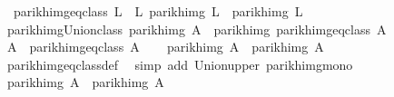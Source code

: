 \begin{isabellebody}
\ \ {\isachardoublequoteopen}parikh{\isacharunderscore}{\kern0pt}img{\isacharunderscore}{\kern0pt}eq{\isacharunderscore}{\kern0pt}class\ L\ {\isasymequiv}\ {\isacharbraceleft}{\kern0pt}L{\isacharprime}{\kern0pt}{\isachardot}{\kern0pt}\ parikh{\isacharunderscore}{\kern0pt}img\ L{\isacharprime}{\kern0pt}\ {\isacharequal}{\kern0pt}\ parikh{\isacharunderscore}{\kern0pt}img\ L{\isacharbraceright}{\kern0pt}{\isachardoublequoteclose}\isanewline
\isanewline
\isanewline
{}\isamarkupfalse%
\ parikh{\isacharunderscore}{\kern0pt}img{\isacharunderscore}{\kern0pt}Union{\isacharunderscore}{\kern0pt}class{\isacharcolon}{\kern0pt}\ {\isachardoublequoteopen}parikh{\isacharunderscore}{\kern0pt}img\ A\ {\isacharequal}{\kern0pt}\ parikh{\isacharunderscore}{\kern0pt}img\ {\isacharparenleft}{\kern0pt}{\isasymUnion}{\isacharparenleft}{\kern0pt}parikh{\isacharunderscore}{\kern0pt}img{\isacharunderscore}{\kern0pt}eq{\isacharunderscore}{\kern0pt}class\ A{\isacharparenright}{\kern0pt}{\isacharparenright}{\kern0pt}{\isachardoublequoteclose}\isanewline
%
\isadelimproof
%
\endisadelimproof
%
\isatagproof
{}\isamarkupfalse%
\isanewline
\ \ \isamarkupfalse%
\ {\isacharquery}{\kern0pt}A{\isacharprime}{\kern0pt}\ {\isacharequal}{\kern0pt}\ {\isachardoublequoteopen}{\isasymUnion}{\isacharparenleft}{\kern0pt}parikh{\isacharunderscore}{\kern0pt}img{\isacharunderscore}{\kern0pt}eq{\isacharunderscore}{\kern0pt}class\ A{\isacharparenright}{\kern0pt}{\isachardoublequoteclose}\isanewline
\ \ \isamarkupfalse%
\ {\isachardoublequoteopen}parikh{\isacharunderscore}{\kern0pt}img\ A\ {\isasymsubseteq}\ parikh{\isacharunderscore}{\kern0pt}img\ {\isacharquery}{\kern0pt}A{\isacharprime}{\kern0pt}{\isachardoublequoteclose}\isanewline
\ \ \ \ \isamarkupfalse%
\ parikh{\isacharunderscore}{\kern0pt}img{\isacharunderscore}{\kern0pt}eq{\isacharunderscore}{\kern0pt}class{\isacharunderscore}{\kern0pt}def\ \isamarkupfalse%
\ {\isacharparenleft}{\kern0pt}simp\ add{\isacharcolon}{\kern0pt}\ Union{\isacharunderscore}{\kern0pt}upper\ parikh{\isacharunderscore}{\kern0pt}img{\isacharunderscore}{\kern0pt}mono{\isacharparenright}{\kern0pt}\isanewline
\isanewline
\ \ \isamarkupfalse%
\ {\isachardoublequoteopen}parikh{\isacharunderscore}{\kern0pt}img\ {\isacharquery}{\kern0pt}A{\isacharprime}{\kern0pt}\ {\isasymsubseteq}\ parikh{\isacharunderscore}{\kern0pt}img\ A{\isachardoublequoteclose}\isanewline
\ \ \isamarkupfalse%
\isanewline
\ \ \ \ \isamarkupfalse%

\end{isabellebody}
